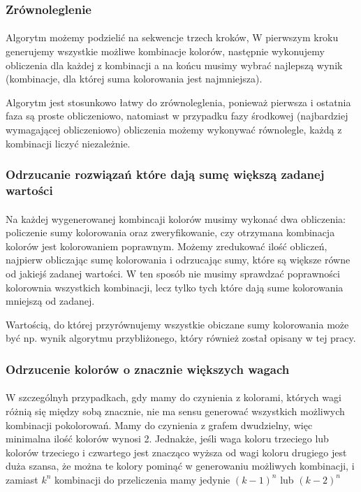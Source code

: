 \documentclass{article}
\begin{document}
\subsubsection*{Zrównoleglenie}

\paragraph{} Algorytm możemy podzielić na sekwencje trzech kroków, W pierwszym kroku generujemy wszystkie możliwe kombinacje kolorów, następnie wykonujemy obliczenia dla każdej z kombinacji a na końcu musimy wybrać najlepszą wynik (kombinacje, dla której suma kolorowania jest najmniejsza).

Algorytm jest stosunkowo łatwy do zrównoleglenia, ponieważ pierwsza i ostatnia faza są proste obliczeniowo, natomiast w przypadku fazy środkowej (najbardziej wymagającej obliczeniowo) obliczenia możemy wykonywać równolegle, każdą z kombinacji liczyć niezależnie.

\subsubsection*{Odrzucanie rozwiązań które dają sumę większą zadanej wartości}

\paragraph{} Na każdej wygenerowanej kombincaji kolorów musimy wykonać dwa obliczenia: policzenie sumy kolorowania oraz zweryfikowanie, czy otrzymana kombinacja kolorów jest kolorowaniem poprawnym. Możemy zredukować ilość obliczeń, najpierw obliczając sumę kolorowania i odrzucając sumy, które są większe równe od jakiejś zadanej wartości. W ten sposób nie musimy sprawdzać poprawności kolorownia wszystkich kombinacji, lecz tylko tych które dają sume kolorowania mniejszą od zadanej.

Wartością, do której przyrównujemy wszystkie obiczane sumy kolorowania może być np. wynik algorytmu przybliżonego, który również został opisany w tej pracy.

\subsubsection*{Odrzucenie kolorów o znacznie większych wagach}

\paragraph{} W szczególnyh przypadkach, gdy mamy do czynienia z kolorami, których wagi różnią się między sobą znacznie, nie ma sensu generować wszystkich możliwych kombinacji pokolorowań. Mamy do czynienia z grafem dwudzielny, więc minimalna ilość kolorów wynosi 2. Jednakże, jeśli waga koloru trzeciego lub kolorów trzeciego i czwartego jest znacząco wyższa od wagi koloru drugiego jest duża szansa, że można te kolory pominąć w generowaniu możliwych kombinacji, i zamiast $k^n$ kombinacji do przeliczenia mamy jedynie $(k-1)^n$ lub $(k-2)^n$
\end{document}
